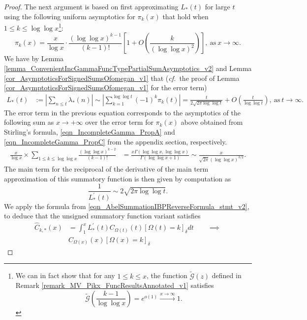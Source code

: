 \documentclass[11pt,reqno,a4letter]{article}
\numberwithin{figure}{section}
\numberwithin{table}{section}
\newcommand{\cf}{\textit{cf.\ }}
\newcommand{\Iverson}[1]{\ensuremath{\left[#1\right]_{\delta}}}
\theoremstyle{plain}
\numberwithin{theorem}{section}
\theoremstyle{definition}
\begin{document}
\begin{proof}
The next argument is based on first approximating $L_{\ast}(t)$ for large $t$ 
using the following uniform asymptotics for $\pi_k(x)$ that hold when 
$1 \leq k \leq \log\log x$\footnote{
     We can in fact show that for any $1 \leq k \leq x$, 
     the function $\widetilde{\mathcal{G}}(z)$ defined in 
     Remark \ref{remark_MV_Pikx_FuncResultsAnnotated_v1} satisfies 
     \[ 
     \widetilde{\mathcal{G}}\left(\frac{k-1}{\log\log x}\right) = e^{o(1)} \xrightarrow{x \rightarrow \infty} 1. 
     \]
}:
\[
\pi_k(x) = \frac{x}{\log x} \cdot \frac{(\log\log x)^{k-1}}{(k-1)!} \left[1 + 
     O\left(\frac{k}{(\log\log x)^2}\right)\right], 
     \mathrm{\ as\ } x \rightarrow \infty. 
\]
We have by Lemma \ref{lemma_ConvenientIncGammaFuncTypePartialSumAsymptotics_v2} and 
Lemma \ref{cor_AsymptoticsForSignedSumsOfomegan_v1} that 
(\cf the proof of Lemma \ref{cor_AsymptoticsForSignedSumsOfomegan_v1} for the error term) 
\begin{align} 
\label{eqn_ProofTag_LAsttSummatoryFuncAsymptotics_v1}
L_{\ast}(t) & := \left\lvert \sum_{n \leq t} \lambda_{\ast}(n) \right\rvert \sim 
     \left\lvert \sum_{k=1}^{\log\log t} (-1)^{k} \pi_k(t) \right\rvert = 
     \frac{t}{2\sqrt{2\pi \log\log t}} + O\left(\frac{t}{\log\log t}\right), 
     \mathrm{\ as\ } t \rightarrow \infty. 
\end{align} 
The error term in the previous equation corresponds to the asymptotics of the 
following sum as $x \rightarrow +\infty$ over the error term for $\pi_k(x)$ above 
obtained from Stirling's formula, \eqref{eqn_IncompleteGamma_PropA} and 
\eqref{eqn_IncompleteGamma_PropC} from the appendix section, respectively. 
\begin{align*} 
\frac{x}{\log x} \times \sum_{1 \leq k \leq \log\log x} \frac{(\log\log x)^{k-2}}{(k-1)!} & = 
     \frac{x \Gamma(\log\log x, \log\log x)}{\Gamma(\log\log x + 1)} 
     \sim \frac{x}{\sqrt{2\pi} (\log\log x)^{3/2}}. 
\end{align*}
The main term for the reciprocal of the derivative of the main term approximation of this 
summatory function is then given by computation as 
\[
\frac{1}{L_{\ast}^{\prime}(t)} \sim 2 \sqrt{2\pi \log\log t}. 
\]
We apply the formula from \eqref{eqn_AbelSummationIBPReverseFormula_stmt_v2},  
to deduce that the unsigned summatory function variant satisfies 
\begin{align*} 
     \widehat{C}_{k,\ast}(x) & = \int_1^{x} L_{\ast}^{\prime}(t) C_{\Omega(t)}(t) \Iverson{\Omega(t) = k} 
     dt \qquad \implies \\ 
     & 
     C_{\Omega(x)}(x) \Iverson{\Omega(x) = k} 

\end{align*}
\end{proof}
\end{document}
